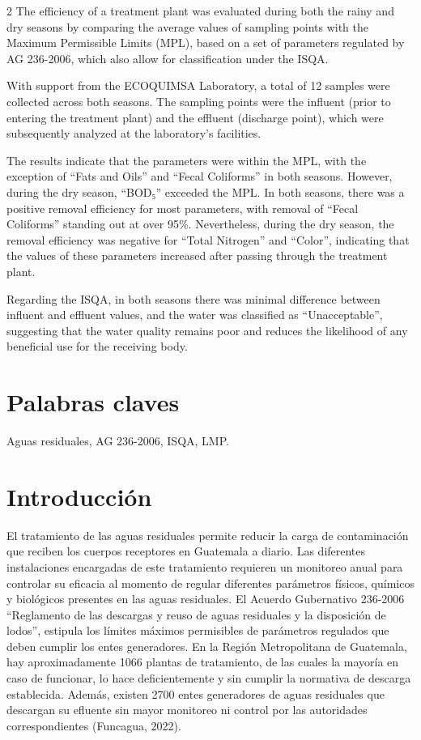 \documentclass[12pt,spanish,Letterpaper,openany]{book}
\begin{document}
\begin {multicols}{2}
The efficiency of a treatment plant was evaluated during both the rainy and dry seasons by comparing the average values of sampling points with the Maximum Permissible Limits (MPL), based on a set of parameters regulated by AG 236-2006, which also allow for classification under the ISQA.

With support from the ECOQUIMSA Laboratory, a total of 12 samples were collected across both seasons. The sampling points were the influent (prior to entering the treatment plant) and the effluent (discharge point), which were subsequently analyzed at the laboratory's facilities.

The results indicate that the parameters were within the MPL, with the exception of ``Fats and Oils'' and ``Fecal Coliforms'' in both seasons. However, during the dry season, ``BOD₅'' exceeded the MPL. In both seasons, there was a positive removal efficiency for most parameters, with removal of ``Fecal Coliforms'' standing out at over 95\%. Nevertheless, during the dry season, the removal efficiency was negative for ``Total Nitrogen'' and ``Color'', indicating that the values of these parameters increased after passing through the treatment plant.

Regarding the ISQA, in both seasons there was minimal difference between influent and effluent values, and the water was classified as ``Unacceptable'', suggesting that the water quality remains poor and reduces the likelihood of any beneficial use for the receiving body.

\hypertarget{palabras-claves-5}{%
\section{Palabras claves}\label{palabras-claves-5}}

Aguas residuales, AG 236-2006, ISQA, LMP.

\hypertarget{introducciuxf3n-5}{%
\section{Introducción}\label{introducciuxf3n-5}}

El tratamiento de las aguas residuales permite reducir la carga de contaminación que reciben los cuerpos receptores en Guatemala a diario. Las diferentes instalaciones encargadas de este tratamiento requieren un monitoreo anual para controlar su eficacia al momento de regular diferentes parámetros físicos, químicos y biológicos presentes en las aguas residuales. El Acuerdo Gubernativo 236-2006 ``Reglamento de las descargas y reuso de aguas residuales y la disposición de lodos'', estipula los límites máximos permisibles de parámetros regulados que deben cumplir los entes generadores.
En la Región Metropolitana de Guatemala, hay aproximadamente 1066 plantas de tratamiento, de las cuales la mayoría en caso de funcionar, lo hace deficientemente y sin cumplir la normativa de descarga establecida. Además, existen 2700 entes generadores de aguas residuales que descargan su efluente sin mayor monitoreo ni control por las autoridades correspondientes (Funcagua, 2022).


\end{multicols}
\end{document}
